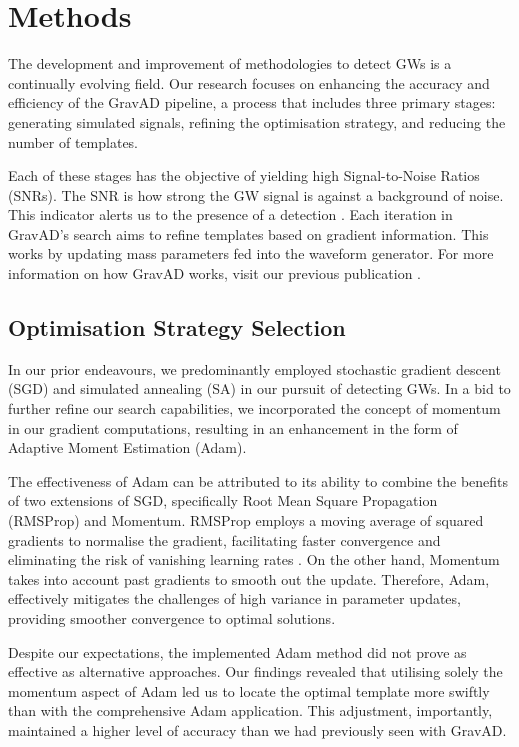 \documentclass[twocolumn, aps, pra]{revtex4-2}
\begin{document}
	
	\section{Methods} 
	
	The development and improvement of methodologies to detect GWs is a continually evolving field. Our research focuses on enhancing the accuracy and efficiency of the GravAD pipeline, a process that includes three primary stages: generating simulated signals, refining the optimisation strategy, and reducing the number of templates.
	
	Each of these stages has the objective of yielding high Signal-to-Noise Ratios (SNRs). The SNR is how strong the GW signal is against a background of noise. This indicator alerts us to the presence of a detection \cite{snr}. Each iteration in GravAD's search aims to refine templates based on gradient information. This works by updating mass parameters fed into the waveform generator. For more information on how GravAD works, visit our previous publication \cite{Doyle_2023}.
		
	\subsection{Optimisation Strategy Selection}
	
	In our prior endeavours, we predominantly employed stochastic gradient descent (SGD) and simulated annealing (SA) in our pursuit of detecting GWs. In a bid to further refine our search capabilities, we incorporated the concept of momentum in our gradient computations, resulting in an enhancement in the form of Adaptive Moment Estimation (Adam).
	
	The effectiveness of Adam can be attributed to its ability to combine the benefits of two extensions of SGD, specifically Root Mean Square Propagation (RMSProp) and Momentum. RMSProp employs a moving average of squared gradients to normalise the gradient, facilitating faster convergence and eliminating the risk of vanishing learning rates \cite{rmsprop}. On the other hand, Momentum takes into account past gradients to smooth out the update. Therefore, Adam, effectively mitigates the challenges of high variance in parameter updates, providing smoother convergence to optimal solutions.
	
	Despite our expectations, the implemented Adam method did not prove as effective as alternative approaches. Our findings revealed that utilising solely the momentum aspect of Adam led us to locate the optimal template more swiftly than with the comprehensive Adam application. This adjustment, importantly, maintained a higher level of accuracy than we had previously seen with GravAD.
	
\end{document}
